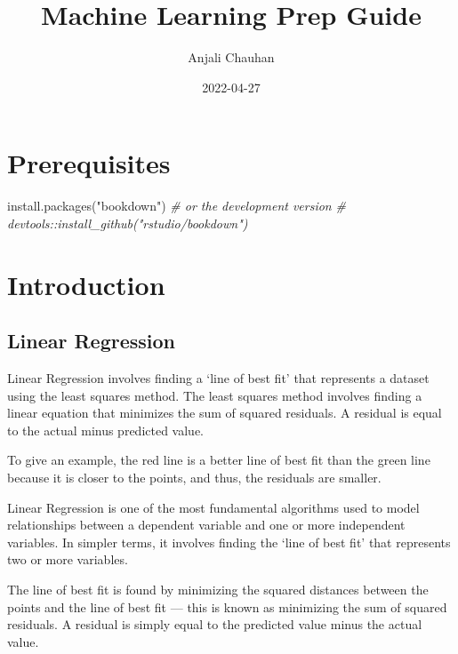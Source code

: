\documentclass[
]{book}
\title{Machine Learning Prep Guide}
\author{Anjali Chauhan}
\date{2022-04-27}
\newenvironment{Shaded}{\begin{snugshade}}{\end{snugshade}}
\newcommand{\CommentTok}[1]{\textcolor[rgb]{0.56,0.35,0.01}{\textit{#1}}}
\newcommand{\FunctionTok}[1]{\textcolor[rgb]{0.00,0.00,0.00}{#1}}
\newcommand{\NormalTok}[1]{#1}
\newcommand{\StringTok}[1]{\textcolor[rgb]{0.31,0.60,0.02}{#1}}
\begin{document}
\maketitle

{
\setcounter{tocdepth}{1}
\tableofcontents
}
\hypertarget{prerequisites}{%
\chapter{Prerequisites}\label{prerequisites}}

\begin{Shaded}
\begin{Highlighting}[]
\FunctionTok{install.packages}\NormalTok{(}\StringTok{"bookdown"}\NormalTok{)}
\CommentTok{\# or the development version}
\CommentTok{\# devtools::install\_github("rstudio/bookdown")}
\end{Highlighting}
\end{Shaded}

\hypertarget{intro}{%
\chapter{Introduction}\label{intro}}

\hypertarget{linear-regression}{%
\section{Linear Regression}\label{linear-regression}}

Linear Regression involves finding a `line of best fit' that represents a dataset using the least squares method. The least squares method involves finding a linear equation that minimizes the sum of squared residuals. A residual is equal to the actual minus predicted value.

To give an example, the red line is a better line of best fit than the green line because it is closer to the points, and thus, the residuals are smaller.

Linear Regression is one of the most fundamental algorithms used to model relationships between a dependent variable and one or more independent variables. In simpler terms, it involves finding the `line of best fit' that represents two or more variables.

The line of best fit is found by minimizing the squared distances between the points and the line of best fit --- this is known as minimizing the sum of squared residuals. A residual is simply equal to the predicted value minus the actual value.
\end{document}
